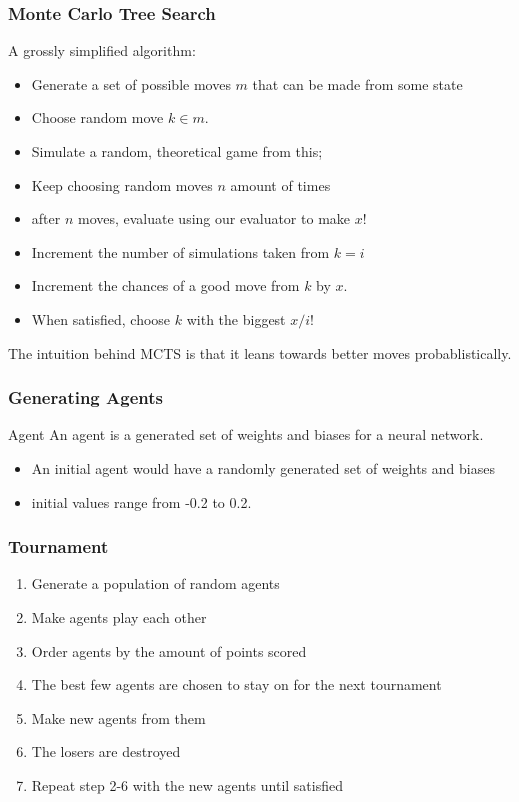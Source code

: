 \documentclass[aspectratio=169]{beamer}
\begin{document}
	\begin{frame}
		\frametitle{Monte Carlo Tree Search}

		A grossly simplified algorithm:

		\begin{itemize}
			\item Generate a set of possible moves $m$ that can be made from some state
			\item Choose random move $k \in m$.
			\item Simulate a random, theoretical game from this;
			\item Keep choosing random moves $n$ amount of times
			\item after $n$ moves, evaluate using our evaluator to make $x$!
			\item Increment the number of simulations taken from $k = i$ 
			\item Increment the chances of a good move from $k$ by $x$.
			\item When satisfied, choose $k$ with the biggest $x/i$!
		\end{itemize}

		The intuition behind MCTS is that it leans towards better moves probablistically.
	\end{frame}

	\begin{frame}
		\frametitle{Generating Agents}
		\begin{block}{Agent}
			An agent is a generated set of weights and biases for a neural network.
		\end{block}

		\begin{itemize}
			\item An initial agent would have a randomly generated set of weights and biases
			\item initial values range from -0.2 to 0.2.
		\end{itemize}
	\end{frame}

	\begin{frame}
		\frametitle{Tournament}
		\begin{enumerate}
			\item Generate a population of random agents
			\item Make agents play each other
			\item Order agents by the amount of points scored
			\item The best few agents are chosen to stay on for the next tournament
			\item Make new agents from them
			\item The losers are destroyed
			\item Repeat step 2-6 with the new agents until satisfied
		\end{enumerate}
	\end{frame}
\end{document}
